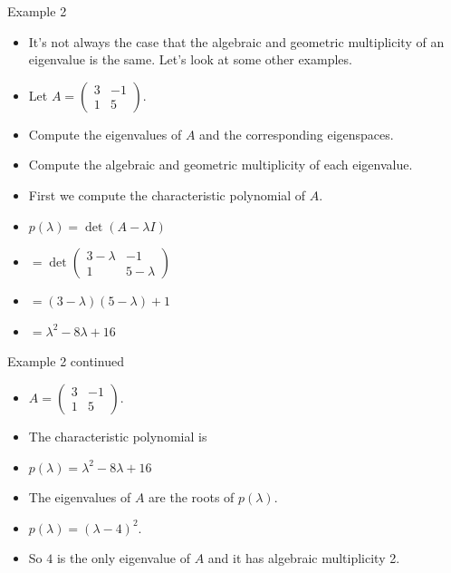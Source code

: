\documentclass{beamer}
\begin{document}
\begin{frame}{Example 2}

\begin{itemize}
\item It's not always the case that the algebraic and geometric multiplicity
of an eigenvalue is the same. Let's look at some other examples.
\item Let
$A=
\begin{pmatrix}
3 & -1 \\
1 & 5
\end{pmatrix}
$.
\item Compute the eigenvalues of $A$ and the corresponding eigenspaces.
\item Compute the algebraic and geometric multiplicity of each eigenvalue.
\item First we compute the characteristic polynomial of $A$.
\item $p(\lambda) = \det(A-\lambda I)$
\item $=\det
\begin{pmatrix}
3 -\lambda & -1 \\
1 & 5 - \lambda
\end{pmatrix}
$
\item $=(3-\lambda)(5-\lambda) + 1$
\item $=\lambda^2 - 8\lambda + 16$
\end{itemize}
\end{frame}

\begin{frame}{Example 2 continued}

\begin{itemize}
\item $A=
\begin{pmatrix}
3 & -1 \\
1 & 5
\end{pmatrix}
$.
\item The characteristic polynomial is
\item $p(\lambda) =\lambda^2 - 8\lambda + 16$
\item The eigenvalues of $A$ are the roots of $p(\lambda)$.
\item $p(\lambda) = (\lambda - 4)^2$.
\item So $4$ is the only eigenvalue of $A$ and it has algebraic multiplicity 2.
\end{itemize}
\end{frame}
\end{document}
